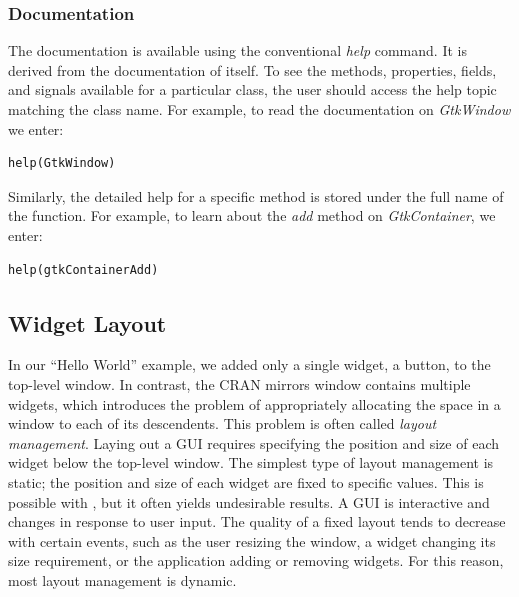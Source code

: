 \documentclass[article]{jss}
\begin{document}
\subsubsection{Documentation}

The  documentation is available using the conventional
\emph{help} command. It is derived from the documentation of
 itself.
To see the methods, properties, fields, and signals available
for a particular class, the user should access the help topic matching
the class name.
For example, to read the documentation on \emph{GtkWindow} we enter:
\begin{verbatim}
help(GtkWindow)
\end{verbatim}

Similarly, the detailed help for a specific method is stored under the
full
name of the function. For example, to learn about the \emph{add}
method on
\emph{GtkContainer}, we enter:
\begin{verbatim}
help(gtkContainerAdd)
\end{verbatim}

\subsection{Widget Layout}\label{sec:layout}

In our ``Hello World'' example, we added only a single widget, a
button, to the 
top-level window. In contrast, the CRAN mirrors window contains
multiple 
widgets, which introduces the problem of appropriately allocating the
space in a
window to each of its descendents. This problem is often called
\emph{layout management}.
Laying out a GUI requires specifying the position and size of each
widget below
the top-level window. The simplest type of layout management is
static; the
position and size of each widget are fixed to specific values. This is
possible
with , but it often yields undesirable results. A GUI is
interactive 
and changes in response to user input. The quality of a fixed layout
tends to decrease
with certain events, such as the user resizing
the window, a widget changing its size requirement, or the application
adding or removing widgets. For this reason, most layout management is
dynamic.
\end{document}
